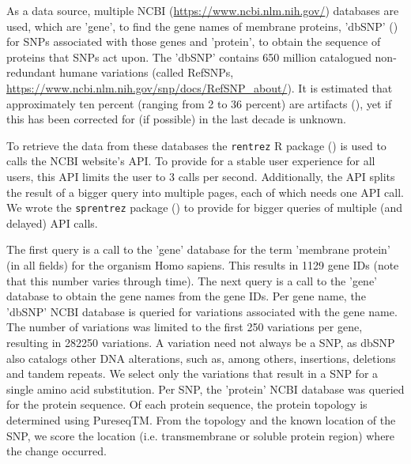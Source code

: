 
As a data source, multiple
NCBI (\url{https://www.ncbi.nlm.nih.gov/}) databases are used,
which are 'gene', to find the gene names of membrane proteins, 
'dbSNP' (\cite{sherry2001dbsnp}) for SNPs associated with those genes
and 'protein', to obtain the sequence of proteins that SNPs act upon.
The 'dbSNP' contains 650 million 
catalogued non-redundant humane variations (called RefSNPs,
\url{https://www.ncbi.nlm.nih.gov/snp/docs/RefSNP_about/}).
It is estimated that approximately ten percent (ranging from 2 to 36 percent) 
are artifacts (\cite{carlson2003additional, cutler2001high, gabriel2002structure, mitchell2004discrepancies, musumeci2010single, reich2003quality}),
yet if this has been corrected for (if possible) in the last decade is unknown.


To retrieve the data from these databases the
\verb;rentrez; R package (\cite{rentrez}) is used
to calls the NCBI website's API. To provide for a 
stable user experience for all users, 
this API limits the user to 3 calls per second.
Additionally, the API splits the result of a bigger
query into multiple pages, each of which needs one API call.
We wrote the \verb;sprentrez; package (\cite{sprentrez}) to provide for 
bigger queries of multiple (and delayed) API calls.


The first query is a call to the 'gene' database for the 
term 'membrane protein' (in all fields) for the organism Homo sapiens.
This results in 1129 gene IDs (note that this number varies through time).
The next query is a call to the 'gene' database 
to obtain the gene names from the gene IDs.
Per gene name, the 'dbSNP' NCBI database is queried for 
variations associated with the gene name. 
The number of variations
was limited to the first 250 variations per gene,
resulting in 282250 variations. A variation need not always be a SNP,
as dbSNP also catalogs other DNA alterations, such as, among others, insertions,
deletions and tandem repeats.
We select only the variations that result in a SNP for
a single amino acid substitution.
Per SNP, the 'protein' NCBI database was queried for the
protein sequence.
Of each protein sequence, the protein topology is determined 
using PureseqTM.
From the topology and the known location of the SNP, 
we score the location (i.e. transmembrane or soluble protein region) 
where the change occurred.


